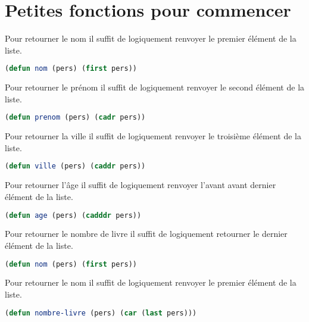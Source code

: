 \documentclass[a4paper, 12pt, leqno]{report}
\theoremstyle{plain}
\begin{document}
                \section{Petites fonctions pour commencer}
                Pour retourner le nom il suffit de logiquement renvoyer le premier élément de la liste.
              \begin{lstlisting}[label=some-code,caption=nom(Personne),language=lisp]
                (defun nom (pers) (first pers))
            \end{lstlisting}
            
            Pour retourner le prénom il suffit de logiquement renvoyer le second élément de la liste.
              \begin{lstlisting}[label=some-code,caption=prenom(Personne),language=lisp]
                (defun prenom (pers) (cadr pers))
            \end{lstlisting} 
            
            Pour retourner la ville il suffit de logiquement renvoyer le troisième élément de la liste.
              \begin{lstlisting}[label=some-code,caption=ville(Personne),language=lisp]
                (defun ville (pers) (caddr pers))
            \end{lstlisting} 
            
            Pour retourner l’âge il suffit de logiquement renvoyer l'avant avant dernier élément de la liste.
              \begin{lstlisting}[label=some-code,caption=age(Personne),language=lisp]
                (defun age (pers) (cadddr pers))
            \end{lstlisting} 
            
            Pour retourner le nombre de livre il suffit de logiquement retourner le dernier élément de la liste.
              \begin{lstlisting}[label=some-code,caption=nom(Personne),language=lisp]
                (defun nom (pers) (first pers))
            \end{lstlisting} 
            
            Pour retourner le nom il suffit de logiquement renvoyer le premier élément de la liste.
              \begin{lstlisting}[label=some-code,caption=nombre-livre(Personne),language=lisp]
                (defun nombre-livre (pers) (car (last pers)))
            \end{lstlisting} 
            
\end{document}
